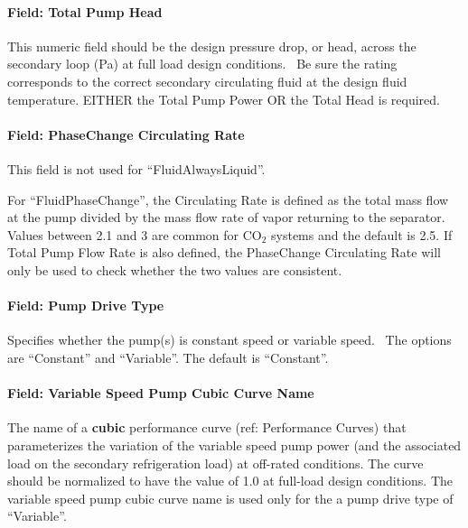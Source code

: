\paragraph{Field: Total Pump Head}\label{field-total-pump-head}

This numeric field should be the design pressure drop, or head, across the secondary loop (Pa) at full load design conditions.~ Be sure the rating corresponds to the correct secondary circulating fluid at the design fluid temperature. EITHER the Total Pump Power OR the Total Head is required.

\paragraph{Field: PhaseChange Circulating Rate}\label{field-phasechange-circulating-rate}

This field is not used for ``FluidAlwaysLiquid''.

For ``FluidPhaseChange'', the Circulating Rate is defined as the total mass flow at the pump divided by the mass flow rate of vapor returning to the separator. Values between 2.1 and 3 are common for CO\(_{2}\) systems and the default is 2.5. If Total Pump Flow Rate is also defined, the PhaseChange Circulating Rate will only be used to check whether the two values are consistent.

\paragraph{Field: Pump Drive Type}\label{field-pump-drive-type}

Specifies whether the pump(s) is constant speed or variable speed.~ The options are ``Constant'' and ``Variable''. The default is ``Constant''.

\paragraph{Field: Variable Speed Pump Cubic Curve Name}\label{field-variable-speed-pump-cubic-curve-name}

The name of a \textbf{cubic} performance curve (ref: Performance Curves) that parameterizes the variation of the variable speed pump power (and the associated load on the secondary refrigeration load) at off-rated conditions. The curve should be normalized to have the value of 1.0 at full-load design conditions. The variable speed pump cubic curve name is used only for the a pump drive type of ``Variable''.

